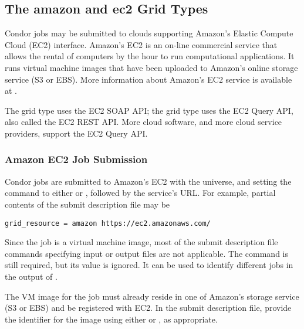 \subsection{\label{sec:Amazon}The amazon and ec2 Grid Types }

Condor jobs may be submitted to clouds supporting
Amazon's Elastic Compute Cloud (EC2) interface.
Amazon's EC2 is an on-line commercial service that allows 
the rental of computers by the hour to run computational applications.
It runs virtual machine images that have been uploaded to Amazon's
online storage service (S3 or EBS).
More information about Amazon's EC2 service is available at
.

The  grid type uses the EC2 SOAP API;
the  grid type uses the EC2 Query API,
also called the EC2 REST API.
More cloud software, and more cloud service providers, support the 
EC2 Query API.

\subsubsection{\label{sec:Amazon-submit}Amazon EC2 Job Submission}

Condor jobs are submitted to Amazon's EC2
with the  universe, and setting the
 command to either
  or , followed by the service's URL.
For example,
partial contents of the submit description file may be
\begin{verbatim}
grid_resource = amazon https://ec2.amazonaws.com/
\end{verbatim}

Since the job is a virtual machine image,
most of the submit description file commands
specifying input or output files are not applicable.
The  command is still required,
but its value is ignored. 
It can be used to identify different jobs in the output of .

The VM image for the job must already reside in one of Amazon's storage
service (S3 or EBS) and be registered with EC2.
In the submit description file,
provide the identifier for the image using either
 or ,
as appropriate.

